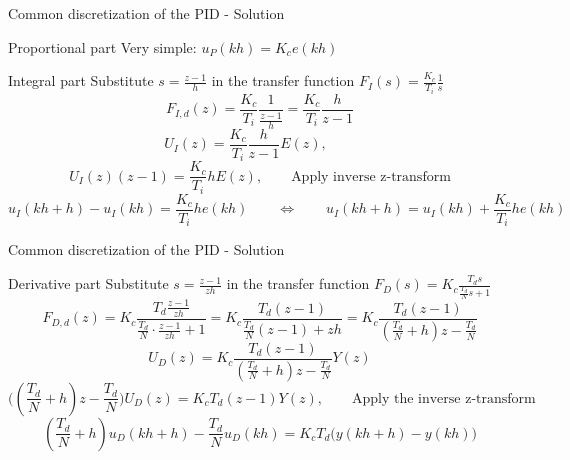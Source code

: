 \documentclass[presentation,aspectratio=1610]{beamer}
\begin{document}
\begin{frame}[label={sec:orgc818e6c}]{Common discretization of the PID  - Solution}
\begin{block}{Proportional part}
Very simple: \(u_P(kh) = K_c e(kh)\)
\end{block}
\begin{block}{Integral part}
Substitute \(s = \frac{z-1}{h}\) in the transfer function \(F_I(s) = \frac{K_c}{T_i} \frac{1}{s}\)
\[ F_{I,d}(z) = \frac{K_c}{T_i}\frac{1}{\frac{z-1}{h}} = \frac{K_c}{T_i} \frac{h}{z-1}\]
\[U_I(z) = \frac{K_c}{T_i} \frac{h}{z-1} E(z), \qquad \text{}\]
\[U_I(z)(z-1) = \frac{K_c}{T_i} h E(z), \qquad \text{Apply inverse z-transform}\]
\[ u_I(kh+h) - u_I(kh) = \frac{K_c}{T_i} h e(kh) \qquad \Leftrightarrow \qquad u_I(kh+h) = u_I(kh) + \frac{K_c}{T_i} h e(kh)\]
\end{block}
\end{frame}

\begin{frame}[label={sec:orgb0f28b9}]{Common discretization of the PID  - Solution}
\begin{block}{Derivative part}
Substitute \(s = \frac{z-1}{zh}\) in the transfer function \(F_D(s) = K_c \frac{T_d s}{\frac{T_d}{N} s + 1}\)
\[ F_{D,d}(z) = K_c\frac{T_d \frac{z-1}{zh}}{\frac{T_d}{N}\cdot\frac{z-1}{zh}+1} 
         = K_c \frac{T_d(z-1)}{\frac{T_d}{N}(z-1) + zh} 
= K_c \frac{T_d(z-1)}{(\frac{T_d}{N}+h)z -\frac{T_d}{N}} \]
\[ U_D(z) = K_c \frac{T_d(z-1)}{(\frac{T_d}{N}+h)z -\frac{T_d}{N}} Y(z)\]
\[ \Big((\frac{T_d}{N}+h)z -\frac{T_d}{N}\Big) U_D(z) = K_cT_d(z-1) Y(z), \qquad \text{Apply the inverse z-transform} \]
\[ (\frac{T_d}{N}+h)u_D(kh+h) -\frac{T_d}{N}u_D(kh) = K_cT_d\big(y(kh+h) - y(kh)\big)\]
\end{block}
\end{frame}
\end{document}
